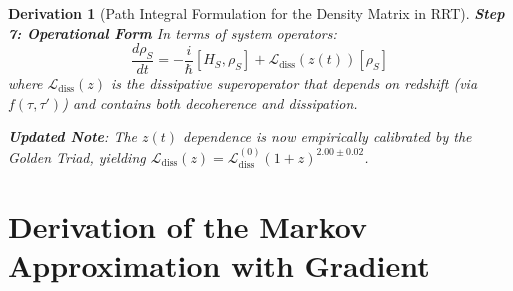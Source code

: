 \documentclass[10pt, a4paper]{article}
\newtheorem{derivation}{Derivation}
\begin{document}
\begin{derivation}[Path Integral Formulation for the Density Matrix in RRT]
\textbf{Step 7: Operational Form}
In terms of system operators:
\begin{equation}
\frac{d\rho_S}{dt} = -\frac{i}{\hbar}[H_S, \rho_S] + \mathcal{L}_{\text{diss}}(z(t))[\rho_S]
\tag{23.7}
\end{equation}
where $\mathcal{L}_{\text{diss}}(z)$ is the dissipative superoperator that depends on redshift (via $f(\tau,\tau')$) and contains both decoherence and dissipation.

\textbf{Updated Note}: The $z(t)$ dependence is now empirically calibrated by the Golden Triad, yielding $\mathcal{L}_{\text{diss}}(z) = \mathcal{L}_{\text{diss}}^{(0)} (1+z)^{2.00 \pm 0.02}$.
\end{derivation}

\section{Derivation of the Markov Approximation with Gradient}
\end{document}
